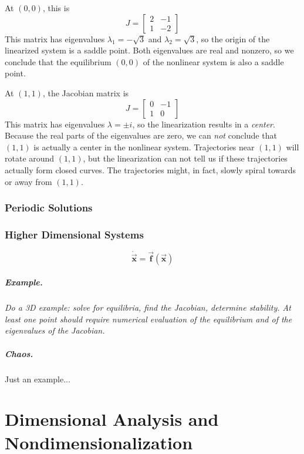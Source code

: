 \documentclass{book}
\newcommand{\BF}{\vec{\textbf{f}}}
\newcommand{\BX}{\vec{\textbf{x}}}
\begin{document}
At $(0,0)$, this is
\begin{equation}
  J = \begin{bmatrix}
           2 & -1 \\
	   1 & -2
      \end{bmatrix}
\end{equation}
This matrix has eigenvalues $\lambda_1 = -\sqrt{3}$ 
and $\lambda_2 = \sqrt{3}$, so the
origin of the  linearized system is a saddle point.
Both eigenvalues are real and nonzero,
so we conclude that the equilibrium
$(0,0)$ of the nonlinear system is also a saddle point.

At $(1,1)$, the Jacobian matrix is
\begin{equation}
  J = \begin{bmatrix}
           0 & -1 \\
	   1 & 0
      \end{bmatrix}
\end{equation}
This matrix has eigenvalues $\lambda=\pm i$,
so the linearization results in a \emph{center}.
Because the real parts of the eigenvalues are
zero, we can \emph{not} conclude that $(1,1)$
is actually a center in the nonlinear system.
Trajectories near $(1,1)$ will rotate around $(1,1)$, but
the linearization can not tell us if these trajectories
actually form closed curves.
The trajectories might, in fact, slowly spiral
towards or away from $(1,1)$.

%
\subsection{Periodic Solutions}
%
\subsection{Higher Dimensional Systems}
\[
  \dot{\BX} = \BF(\BX)
\]
\paragraph{Example.}
\emph{Do a 3D example: solve for equilibria, find the
Jacobian, determine stability.  At least one point
should require numerical evaluation of the equilibrium
and of the eigenvalues of the Jacobian.}
\paragraph{Chaos.} Just an example...
%
%
%

\chapter[Dimensional Analysis]{Dimensional Analysis and Nondimensionalization}
\end{document}
